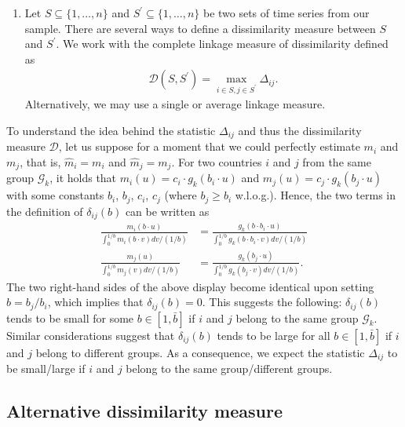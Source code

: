 \documentclass[a4paper,12pt]{article}
\numberwithin{equation}{section}
\begin{document}
\begin{enumerate}[label=\textit{Step \arabic*.},leftmargin=1.45cm]
\item Let $S \subseteq \{1, \ldots, n\}$ and $S^\prime \subseteq \{1, \ldots, n\}$ be two sets of time series from our sample. There are several ways to define a dissimilarity measure between $S$ and $S^\prime$. We work with the complete linkage measure of dissimilarity defined as 
\begin{align*}
\mathcal{D} (S, S^\prime) = \max_{i \in S, j\in S^\prime} \Delta_{ij}.
\end{align*}
Alternatively, we may use a single or average linkage measure. 


\end{enumerate}


To understand the idea behind the statistic $\Delta_{ij}$ and thus the dissimilarity measure $\mathcal{D}$, let us suppose for a moment that we could perfectly estimate $m_i$ and $m_j$, that is, $\hat{m}_i = m_i$ and $\hat{m}_j = m_j$. For two countries $i$ and $j$ from the same group $\mathcal{G}_k$, it holds that $m_i(u) = c_i \cdot g_k(b_i \cdot u)$ and $m_j(u) = c_j \cdot g_k(b_j \cdot u)$ with some constants $b_i$, $b_j$, $c_i$, $c_j$ (where $b_j \ge b_i$ w.l.o.g.). Hence, the two terms in the definition of $\delta_{ij}(b)$ can be written as  
\begin{align*}
\frac{m_i (b\cdot u)}{\int_0^{1/b} m_i(b\cdot v) dv /(1/b)} & = \frac{g_k (b \cdot b_i \cdot u)}{\int_0^{1/b} g_k(b \cdot b_i \cdot v) dv /(1/b)} \\
\frac{m_j (u)}{\int_0^{1/b} m_j(v) dv /(1/b)} & = \frac{g_k (b_j \cdot u)}{\int_0^{1/b} g_k(b_j \cdot v) dv /(1/b)}.
\end{align*}
The two right-hand sides of the above display become identical upon setting $b = b_j/b_i$, which implies that $\delta_{ij}(b) = 0$. This suggests the following: $\delta_{ij}(b)$ tends to be small for some $b \in [1,\bar{b}]$ if $i$ and $j$ belong to the same group $\mathcal{G}_k$. Similar considerations suggest that $\delta_{ij}(b)$ tends to be large for all $b \in [1,\bar{b}]$ if $i$ and $j$ belong to different groups. As a consequence, we expect the statistic $\Delta_{ij}$ to be small/large if $i$ and $j$ belong to the same group/different groups. 

\subsection{Alternative dissimilarity measure}\label{subsec:diss_alt}
\end{document}

